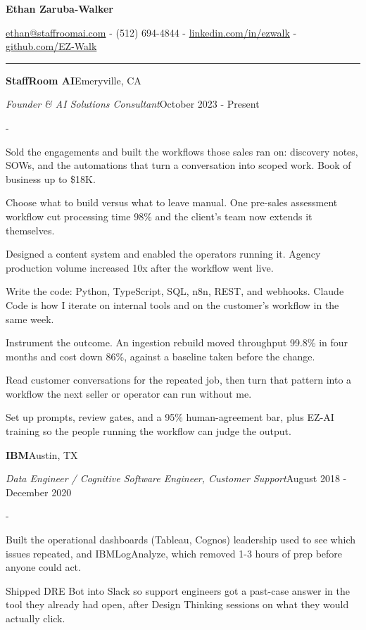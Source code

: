 \documentclass[10pt,letterpaper]{article}
\newenvironment{cvitems}{%
  \begin{list}{-}{%
    \setlength{\leftmargin}{12pt}%
    \setlength{\itemsep}{1.2pt}%
    \setlength{\parsep}{0pt}%
    \setlength{\topsep}{1.5pt}%
    \setlength{\partopsep}{0pt}%
    \setlength{\labelwidth}{6pt}%
    \setlength{\labelsep}{6pt}%
    \setlength{\itemindent}{0pt}%
  }%
}{\end{list}}
\newcommand{\cvsection}[1]{%
  \vspace{7pt}%
  \noindent{\bfseries\fontsize{11pt}{13pt}\selectfont\MakeUppercase{#1}}\par
  \vspace{1pt}%
  \noindent\rule{\textwidth}{0.4pt}\par
  \vspace{4pt}%
}
\newcommand{\cventryhead}[4]{%
  \noindent\textbf{#1}\hfill#2\par
  \vspace{0.5pt}%
  \noindent\textit{#3}\hfill#4\par
}
\begin{document}
\begin{center}
  {\bfseries\fontsize{22pt}{24pt}\selectfont Ethan Zaruba-Walker\par}
  \vspace{4pt}
  {\fontsize{10pt}{12pt}\selectfont
    \href{mailto:ethan@staffroomai.com}{ethan@staffroomai.com}
    {-}
    (512) 694-4844
    {-}
    \href{https://linkedin.com/in/ezwalk}{linkedin.com/in/ezwalk}
    {-}
    \href{https://github.com/EZ-Walk}{github.com/EZ-Walk}\par}
\end{center}
\vspace{2pt}

\cvsection{Experience}

\cventryhead{StaffRoom AI}{Emeryville, CA}
{Founder \& AI Solutions Consultant}{October 2023 - Present}
\begin{cvitems}
  \item Sold the engagements and built the workflows those sales ran on: discovery notes, SOWs, and the automations that turn a conversation into scoped work. Book of business up to \$18K.
  \item Choose what to build versus what to leave manual. One pre-sales assessment workflow cut processing time 98\% and the client's team now extends it themselves.
  \item Designed a content system and enabled the operators running it. Agency production volume increased 10x after the workflow went live.
  \item Write the code: Python, TypeScript, SQL, n8n, REST, and webhooks. Claude Code is how I iterate on internal tools and on the customer's workflow in the same week.
  \item Instrument the outcome. An ingestion rebuild moved throughput 99.8\% in four months and cost down 86\%, against a baseline taken before the change.
  \item Read customer conversations for the repeated job, then turn that pattern into a workflow the next seller or operator can run without me.
  \item Set up prompts, review gates, and a 95\% human-agreement bar, plus EZ-AI training so the people running the workflow can judge the output.
\end{cvitems}

\vspace{3pt}
\cventryhead{IBM}{Austin, TX}
{Data Engineer / Cognitive Software Engineer, Customer Support}{August 2018 - December 2020}
\begin{cvitems}
  \item Built the operational dashboards (Tableau, Cognos) leadership used to see which issues repeated, and IBMLogAnalyze, which removed 1-3 hours of prep before anyone could act.
  \item Shipped DRE Bot into Slack so support engineers got a past-case answer in the tool they already had open, after Design Thinking sessions on what they would actually click.
\end{cvitems}
\end{document}

